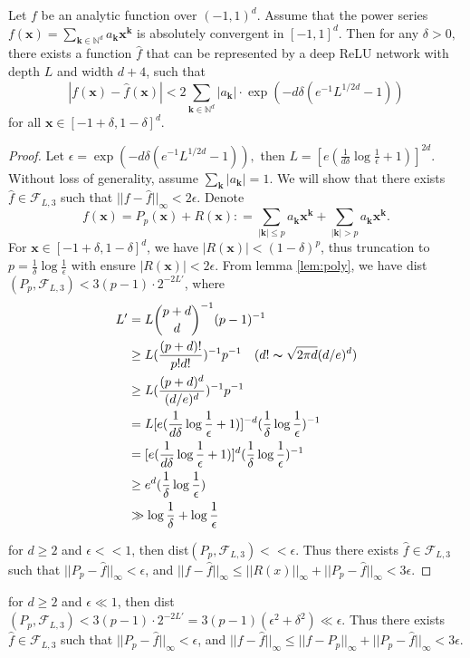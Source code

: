 \begin{theorem}
Let $f$ be an analytic function over $(-1,1)^d$. Assume that the power series $f(\bm x) = \sum_{\bm k\in \mathbb N^d}a_{\bm k}\bm x^{\bm k}$ is absolutely convergent in $[-1,1]^d.$ Then for any $\delta>0,$ there exists a function $\hat f$ that can be represented by a deep ReLU network with depth $L$ and width $d+4$, such that
\[
|f(\bm x) - \hat f(\bm x)|<2\sum_{\bm k\in \mathbb N^d}|a_{\bm k}|\cdot \exp\left(-d\delta\left(e^{-1}L^{1/2d}-1\right)\right)
\]
for all $\bm x\in [-1+\delta,1-\delta]^d.$
\end{theorem}
\begin{proof}
Let $\epsilon = \exp(-d\delta(e^{-1}L^{1/2d}-1)),$ then $L = [e(\frac{1}{d\delta}\log\frac{1}{\epsilon}+1)]^{2d}$. Without loss of generality, assume $\sum_{\bm k}|a_{\bm k}|=1.$ We will show that there exists $\hat f\in \mathcal F_{L,3}$ such that $||f-\hat f||_{\infty}<2\epsilon.$
Denote 
$$
f(\bm x) = P_p(\bm x) + R(\bm x): = \sum_{|\bm k|\le p}a_{\bm k}\bm x^{\bm k} +  \sum_{|\bm k|> p}a_{\bm k}\bm x^{\bm k}.
$$
For $\bm x\in [-1+\delta,1-\delta]^d$, we have $|R(\bm x)|<(1-\delta)^p$, thus truncation to $p = \frac{1}{\delta}\log\frac{1}{\epsilon}$ with ensure $|R(\bm x)|<2\epsilon$. From lemma \ref{lem:poly}, we have dist$(P_p,\mathcal F_{L,3})<3(p-1)\cdot 2^{-2L'}$, where 
\[
\begin{split}
L' &= L\binom{p+d}{d}^{-1}(p-1)^{-1}\\
   &\ge L(\frac{(p+d)!}{p!d!})^{-1}p^{-1}\quad (d! \thicksim \sqrt{2\pi d}(d/e)^d)\\
   &\ge L(\frac{(p+d)^d}{(d/e)^d})^{-1}p^{-1}\\
   &= L[e(\frac{1}{d\delta}\log \frac{1}{\epsilon}+1)]^{-d}(\frac{1}{\delta}\log\frac{1}{\epsilon})^{-1}\\
   & = [e(\frac{1}{d\delta}\log \frac{1}{\epsilon}+1)]^{d}(\frac{1}{\delta}\log\frac{1}{\epsilon})^{-1}\\
   & \ge e^d (\frac{1}{\delta}\log\frac{1}{\epsilon}) \\
   &\gg\log\frac{1}{\delta}+ \log\frac{1}{\epsilon}
\end{split}
\]

for $d\ge 2$ and $\epsilon<<1$, then dist$(P_p,\mathcal F_{L,3})<<\epsilon$. Thus there exists $\hat f\in \mathcal F_{L,3}$ such that $||P_p - \hat f||_{\infty}<\epsilon$, and $||f-\hat f||_{\infty}\le ||R(x)||_\infty + ||P_p - \hat f||_\infty<3\epsilon$.
\end{proof}
for $d\ge 2$ and $\epsilon\ll 1$, then dist$(P_p,\mathcal F_{L,3})<3(p-1)\cdot 2^{-2L'} = 3(p-1)(\epsilon^2+\delta^2)\ll\epsilon$. Thus there exists $\hat f\in \mathcal F_{L,3}$ such that $||P_p - \hat f||_{\infty}<\epsilon$, and $||f-\hat f||_{\infty}\le ||f-P_p||_\infty + ||P_p - \hat f||_\infty<3\epsilon$.

